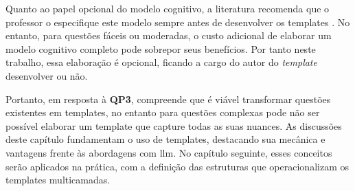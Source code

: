 Quanto ao papel opcional do modelo cognitivo, a literatura recomenda que o professor o especifique este modelo sempre antes de desenvolver os templates \parencite{gierl2021}. No entanto, para questões fáceis ou moderadas, o custo adicional de elaborar um modelo cognitivo completo pode sobrepor seus benefícios. Por tanto neste trabalho, essa elaboração é opcional, ficando a cargo do autor do \textit{template} desenvolver ou não. 


Portanto, em resposta à \textbf{QP3}, compreende que é viável transformar questões existentes em templates, no entanto para questões  complexas pode não ser possível elaborar um template que capture todas as suas nuances. As discussões deste capítulo fundamentam o uso de templates, destacando sua mecânica e vantagens frente às abordagens com \gls{llm}. No capítulo seguinte, esses conceitos serão aplicados na prática, com a definição das estruturas que operacionalizam os templates multicamadas.



